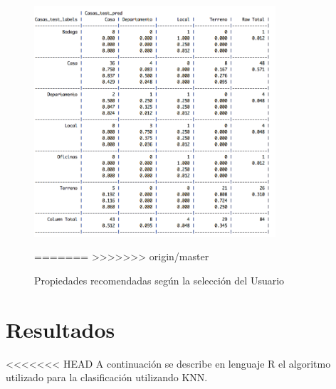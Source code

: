 \begin{figure}[H]
\centering
\includegraphics[width=0.8\textwidth]{ModeloPredictivo.png}
\caption{Propiedades recomendadas según la selección del Usuario}
\label{fig:Clasificador}
=======
>>>>>>> origin/master
\end{figure}


\section{Resultados}
<<<<<<< HEAD
A continuación se describe en lenguaje R el algoritmo utilizado para la clasificación utilizando KNN.

